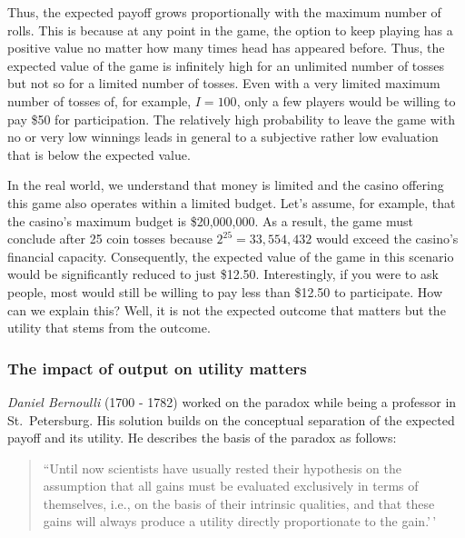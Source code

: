 \documentclass[
  12pt,
  oneside]{book}
\theoremstyle{definition}
\theoremstyle{definition}
\theoremstyle{definition}
\theoremstyle{definition}
\theoremstyle{remark}
\begin{document}
Thus, the expected payoff grows proportionally with the maximum number of rolls. This is because at any point in the game, the option to keep playing has a positive value no matter how many times head has appeared before.
Thus, the expected value of the game is infinitely high for an unlimited number of tosses but not so for a limited number of tosses. Even with a very limited maximum number of tosses of, for example, \(I = 100\), only a few players would be willing to pay
\$50 for participation. The relatively high probability to leave the game with no or very low winnings leads in general to a subjective rather low evaluation that is below the expected value.

In the real world, we understand that money is limited and the casino offering this game also operates within a limited budget.
Let's assume, for example, that the casino's maximum budget is \$20,000,000. As a result, the game must conclude after 25 coin tosses because \(2^{25} = 33,554,432\) would exceed the casino's financial capacity. Consequently, the expected value of the game in this scenario would be significantly reduced to just \$12.50.
Interestingly, if you were to ask people, most would still be willing to pay less than \$12.50 to participate. How can we explain this? Well, it is not the expected outcome that matters but the utility that stems from the outcome.

\hypertarget{the-impact-of-output-on-utility-matters}{%
\subsubsection{The impact of output on utility matters}\label{the-impact-of-output-on-utility-matters}}

\emph{Daniel Bernoulli} (1700 - 1782) worked on the paradox while being a professor in St.~Petersburg. His solution builds on the conceptual separation of the expected payoff and its utility. He describes the basis of the paradox as follows:

\begin{quote}
``Until now scientists have usually rested their hypothesis on the assumption that all gains must be evaluated exclusively in terms of themselves, i.e., on the basis of their intrinsic qualities, and that these gains will always produce a utility directly proportionate to the gain.'\,' \citep[p.~27]{Bernoulli1954Exposition}
\end{quote}
\end{document}

